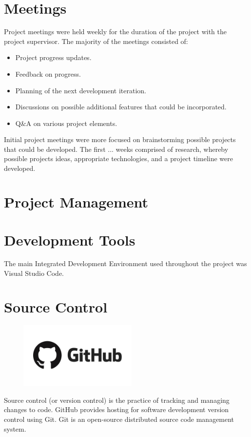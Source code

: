 \section{Meetings}
Project meetings were held weekly for the duration of the project with the project supervisor. The majority of the meetings consisted of:
\begin{itemize}
    \item Project progress updates.
    \item Feedback on progress.
    \item Planning of the next development iteration.
    \item Discussions on possible additional features that could be incorporated.
    \item Q&A on various project elements.
\end{itemize}
\par
\medskip
Initial project meetings were more focused on brainstorming possible projects that could be developed. The first ... weeks comprised of research, whereby possible projects ideas, appropriate technologies, and a project timeline were developed.

\section{Project Management}

\section{Development Tools}
The main Integrated Development Environment used throughout the project was Visual Studio Code.

\newpage
\section{Source Control}
\begin{center}
    \includegraphics[width=8cm,height=3.3cm,keepaspectratio]{images/github}
\end{center}

Source control (or version control) is the practice of tracking and managing changes to code. GitHub provides hosting for software development version control using Git. Git is an open-source distributed source code management system.


